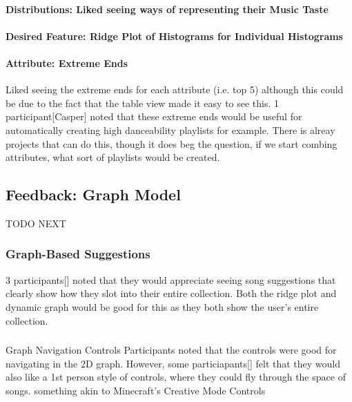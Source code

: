 \paragraph{Distributions: Liked seeing ways of representing their Music Taste}%

\paragraph{Desired Feature: Ridge Plot of Histograms for Individual Histograms}%

\paragraph{Attribute: Extreme Ends}%
Liked seeing the extreme ends for each attribute (i.e. top 5) although this could be due to the fact that the table view made it easy to see this.
1 participant[Casper] noted that these extreme ends would be useful for automatically creating high danceability playlists for example. There is alreay projects that can do this, though it does beg the question, if we start combing attributes, what sort of playlists would be created. %

\subsection{Feedback: Graph Model}
TODO NEXT

\subsubsection{Graph-Based Suggestions}
3 participants[] noted that they would appreciate seeing song suggestions that clearly show how they slot into their entire collection. Both the ridge plot and dynamic graph would be good for this as they both show the user's entire collection.

\subsubsection{}{Graph Navigation Controls}
Participants noted that the controls were good for navigating in the 2D graph. However, some particiapants[] felt that they would also like a 1st person style of controls, where they could fly through the space of songs. something akin to Minecraft's Creative Mode Controls

